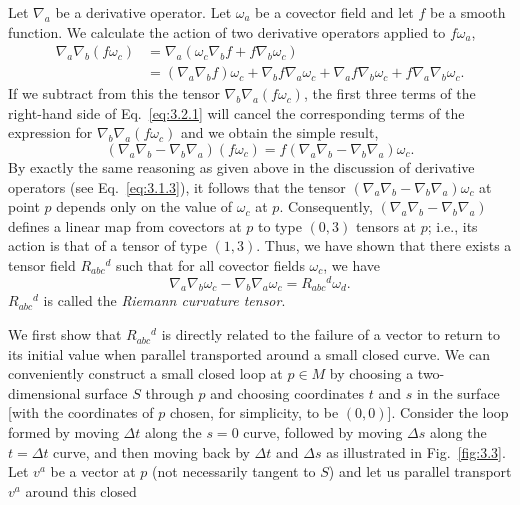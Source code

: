 Let $\nabla_a$ be a derivative operator. Let $\omega_a$ be a covector field and let $f$ be a smooth
function. We calculate the action of two derivative operators applied to $f\omega_a$,
\begin{equation}
  \begin{aligned}
    \nabla_a\nabla_b(f\omega_c)
    &=\nabla_a(\omega_c\nabla_bf+f\nabla_b\omega_c)\\
    &=(\nabla_a\nabla_bf)\omega_c+\nabla_bf\nabla_a\omega_c
      +\nabla_af\nabla_b\omega_c+f\nabla_a\nabla_b\omega_c.
  \end{aligned}
  \tag{3.2.1}\label{eq:3.2.1}
\end{equation}
If we subtract from this the tensor $\nabla_b\nabla_a(f\omega_c)$, the first three terms of the right-hand
side of Eq.~\eqref{eq:3.2.1} will cancel the corresponding terms of the expression for
$\nabla_b\nabla_a(f\omega_c)$ and we obtain the simple result,
\begin{equation}
  (\nabla_a\nabla_b-\nabla_b\nabla_a)(f\omega_c)
  =f(\nabla_a\nabla_b-\nabla_b\nabla_a)\omega_c.
  \tag{3.2.2}\label{eq:3.2.2}
\end{equation}
By exactly the same reasoning as given above in the discussion of derivative operators (see Eq.~\eqref{eq:3.1.3}), it follows that the tensor
$(\nabla_a\nabla_b-\nabla_b\nabla_a)\omega_c$ at point $p$ depends
only on the value of $\omega_c$ at $p$. Consequently,
$(\nabla_a\nabla_b-\nabla_b\nabla_a)$ defines a linear map from
covectors at $p$ to type $(0,3)$ tensors at $p$; i.e., its action is that of a tensor of type
$(1,3)$. Thus, we have shown that there exists a tensor field $R_{abc}{}^d$ such that for all
covector fields $\omega_c$, we have
\begin{equation}
  \nabla_a\nabla_b\omega_c-\nabla_b\nabla_a\omega_c=R_{abc}{}^d\omega_d.
  \tag{3.2.3}\label{eq:3.2.3}
\end{equation}
$R_{abc}{}^d$ is called the \emph{Riemann curvature tensor}.

We first show that $R_{abc}{}^d$ is directly related to the failure of a vector to return to its
initial value when parallel transported around a small closed curve. We can conveniently construct a small closed loop at $p\in M$ by choosing a two-dimensional
surface $S$ through $p$ and choosing coordinates $t$ and $s$ in the surface [with the
coordinates of $p$ chosen, for simplicity, to be $(0,0)$]. Consider the loop formed by
moving $\Delta t$ along the $s=0$ curve, followed by moving $\Delta s$ along the $t=\Delta t$ curve,
and then moving back by $\Delta t$ and $\Delta s$ as illustrated in Fig.~\ref{fig:3.3}. Let $v^a$ be a vector
at $p$ (not necessarily tangent to $S$) and let us parallel transport $v^a$ around this closed

